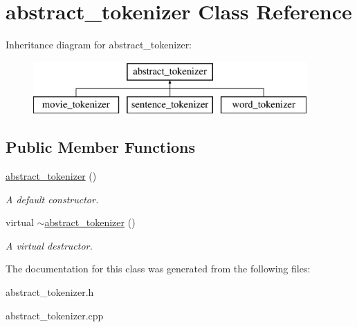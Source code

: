 \hypertarget{classabstract__tokenizer}{}\section{abstract\+\_\+tokenizer Class Reference}
\label{classabstract__tokenizer}
Inheritance diagram for abstract\+\_\+tokenizer\+:\begin{figure}[H]
\begin{center}
\leavevmode
\includegraphics[height=2.000000cm]{classabstract__tokenizer}
\end{center}
\end{figure}
\subsection*{Public Member Functions}
\begin{DoxyCompactItemize}
\item 
\mbox{\label{classabstract__tokenizer_a03902af3bbdd717811b3eb56c9fc0060}} 
\hyperlink{classabstract__tokenizer_a03902af3bbdd717811b3eb56c9fc0060}{abstract\+\_\+tokenizer} ()
\begin{DoxyCompactList}\small\item\em A default constructor. \end{DoxyCompactList}\item 
\mbox{\label{classabstract__tokenizer_aa68856356e49784c7d0eed48d24f8738}} 
virtual \hyperlink{classabstract__tokenizer_aa68856356e49784c7d0eed48d24f8738}{$\sim$abstract\+\_\+tokenizer} ()
\begin{DoxyCompactList}\small\item\em A virtual destructor. \end{DoxyCompactList}\end{DoxyCompactItemize}


The documentation for this class was generated from the following files\+:\begin{DoxyCompactItemize}
\item 
abstract\+\_\+tokenizer.\+h\item 
abstract\+\_\+tokenizer.\+cpp\end{DoxyCompactItemize}
